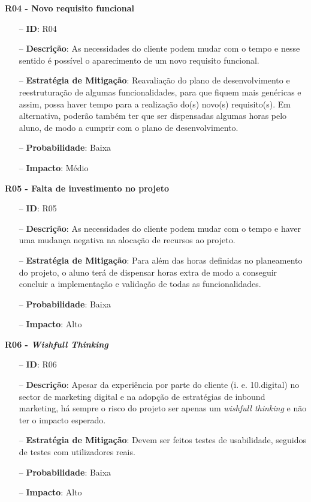 \textbf{R04 - Novo requisito funcional}
\begin{itemize}
	\item[--] \textbf{ID}: R04
	\item[--] \textbf{Descrição}: As necessidades do cliente podem mudar com o tempo e nesse sentido é possível o aparecimento de um novo requisito funcional.
	\item[--] \textbf{Estratégia de Mitigação}: Reavaliação do plano de desenvolvimento e reestruturação de algumas funcionalidades, para que fiquem mais genéricas e assim, possa haver tempo para a realização do(s) novo(s) requisito(s). Em alternativa, poderão também ter que ser dispensadas algumas horas pelo aluno, de modo a cumprir com o plano de desenvolvimento.
	\item[--] \textbf{Probabilidade}: Baixa 
	\item[--] \textbf{Impacto}: Médio
\end{itemize}

\textbf{R05 - Falta de investimento no projeto}
\begin{itemize}
	\item[--] \textbf{ID}: R05
	\item[--] \textbf{Descrição}: As necessidades do cliente podem mudar com o tempo e haver uma mudança negativa na alocação de recursos ao projeto.
	\item[--] \textbf{Estratégia de Mitigação}: Para além das horas definidas no planeamento do projeto, o aluno terá de dispensar horas extra de modo a conseguir concluir a implementação e validação de todas as funcionalidades.
	\item[--] \textbf{Probabilidade}: Baixa 
	\item[--] \textbf{Impacto}: Alto
\end{itemize}

\textbf{R06 - \textit{Wishfull Thinking}}
\begin{itemize}
	\item[--] \textbf{ID}: R06
	\item[--] \textbf{Descrição}: Apesar da experiência por parte do cliente (i. e. 10.digital) no sector de marketing digital e na adopção de estratégias de inbound marketing, há sempre o risco do projeto ser apenas um \textit{wishfull thinking} e não ter o impacto esperado.
	\item[--] \textbf{Estratégia de Mitigação}: Devem ser feitos testes de usabilidade, seguidos de testes com utilizadores reais.
	\item[--] \textbf{Probabilidade}: Baixa
	\item[--] \textbf{Impacto}: Alto
\end{itemize}

